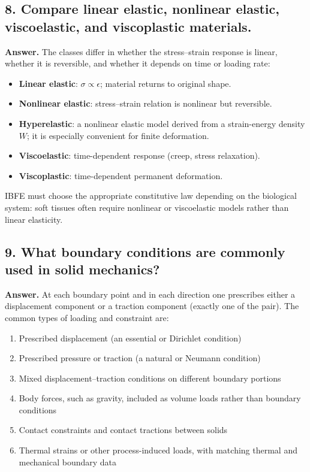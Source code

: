 \documentclass[12pt]{article}
\begin{document}
\subsection*{8. Compare linear elastic, nonlinear elastic, viscoelastic, and viscoplastic materials.}

\textbf{Answer.}
The classes differ in whether the stress--strain response is linear, whether it is reversible, and whether it depends on time or loading rate:

\begin{itemize}
    \item \textbf{Linear elastic}: $\sigma \propto \epsilon$; material returns to original shape.
    \item \textbf{Nonlinear elastic}: stress--strain relation is nonlinear but reversible.
    \item \textbf{Hyperelastic}: a nonlinear elastic model derived from a strain-energy density $W$; it is especially convenient for finite deformation.
    \item \textbf{Viscoelastic}: time-dependent response (creep, stress relaxation).
    \item \textbf{Viscoplastic}: time-dependent permanent deformation.
\end{itemize}

IBFE must choose the appropriate constitutive law depending on the biological system:
soft tissues often require nonlinear or viscoelastic models rather than linear elasticity.


\subsection*{9. What boundary conditions are commonly used in solid mechanics?}

\textbf{Answer.}
At each boundary point and in each direction one prescribes either a displacement component or a traction component (exactly one of the pair). The common types of loading and constraint are:

\begin{enumerate}
    \item Prescribed displacement (an essential or Dirichlet condition)
    \item Prescribed pressure or traction (a natural or Neumann condition)
    \item Mixed displacement--traction conditions on different boundary portions
    \item Body forces, such as gravity, included as volume loads rather than boundary conditions
    \item Contact constraints and contact tractions between solids
    \item Thermal strains or other process-induced loads, with matching thermal and mechanical boundary data
\end{enumerate}
\end{document}

